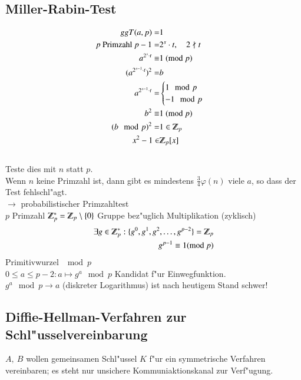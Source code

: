 \subsection{Miller-Rabin-Test}
\begin{align*}
	ggT(a,p)=&1\\
	p\ \text{Primzahl}\	p-1=&2^s \cdot t,\quad 2 \nmid t\\
	a^{2^s\cdot t} \equiv& 1\ (\md{p})\\
	(a^{2^{s-1} \cdot t})^2=&b\\
	a^{2^{s-1} \cdot t} =&
	\begin{cases}
		1 \mod{p} \\
		-1 \mod{p}
	\end{cases} \\
	b^2\equiv& 1\ (\md{p})\\
	(b\mod{p})^2=&1 \in \Z_p\\
	x^2-1 \in & \Z_p [x]
\end{align*}	
\\
Teste dies mit $n$ statt $p$.\\
Wenn $n$ keine Primzahl ist, dann gibt es mindestens $\frac{3}{4} \varphi(n)$ viele $a$, so dass der Test fehlschl"agt.\\
$\rightarrow$ probabilistischer Primzahltest\\
$p$ Primzahl $\Z_p^{*}=\Z_p \setminus \{0\}$ Gruppe bez"uglich Multiplikation (zyklisch)\\
\begin{align*}
	\exists g \in \Z_p^{*} : \{g^0,g^1,g^2,\ldots,g^{p-2}\}=\Z_p\\
	g^{p-1}\equiv 1 (\md{p})
\end{align*}	
Primitivwurzel $\mod{p}$\\
$0 \leq a \leq p-2:a\mapsto g^a \mod{p}$ Kandidat f"ur Einwegfunktion.\\
$g^a \mod{p} \rightarrow a$ (diskreter Logarithmus) ist nach heutigem Stand schwer!\\
\subsection{Diffie-Hellman-Verfahren zur Schl"usselvereinbarung}
$A,\ B$ wollen gemeinsamen Schl"ussel $K$ f"ur ein symmetrische Verfahren vereinbaren; es steht nur unsichere Kommuniaktionskanal zur Verf"ugung.
